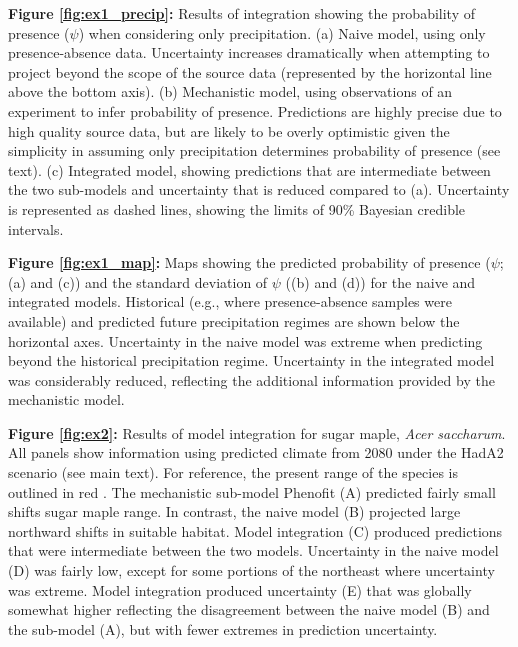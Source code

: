 \documentclass[11pt]{article}
\begin{document}
\begin{flushleft}
\textbf{Figure \ref{fig:ex1_precip}:}
	Results of integration showing the probability of presence (\(\psi\)) when considering only precipitation.
	(a) Naive model, using only presence-absence data. Uncertainty increases dramatically when attempting to project beyond the scope of the source data (represented by the horizontal line above the bottom axis).
	(b) Mechanistic model, using observations of an experiment to infer probability of presence. Predictions are highly precise due to high quality source data, but are likely to be overly optimistic given the simplicity in assuming only precipitation determines probability of presence (see text).
	(c) Integrated model, showing predictions that are intermediate between the two sub-models and uncertainty that is reduced compared to (a).
	Uncertainty is represented as dashed lines, showing the limits of 90\% Bayesian credible intervals.

\textbf{Figure \ref{fig:ex1_map}:}
	Maps showing the predicted probability of presence (\(\psi\); (a) and (c)) and the standard deviation of \(\psi\) ((b) and (d)) for the naive and integrated models.
	Historical (e.g., where presence-absence samples were available) and predicted future precipitation regimes are shown below the horizontal axes.
	Uncertainty in the naive model was extreme when predicting beyond the historical precipitation regime.
	Uncertainty in the integrated model was considerably reduced, reflecting the additional information provided by the mechanistic model.


\textbf{Figure \ref{fig:ex2}:}
	Results of model integration for sugar maple, \emph{Acer saccharum}.
	All panels show information using predicted climate from 2080 under the HadA2 scenario (see main text).
	For reference, the present range of the species is outlined in red \citep{Little1971}.
	The mechanistic sub-model Phenofit (A) predicted fairly small shifts sugar maple range.
	In contrast, the naive model (B) projected large northward shifts in suitable habitat.
	Model integration (C) produced predictions that were intermediate between the two models.
	Uncertainty in the naive model (D) was fairly low, except for some portions of the northeast where uncertainty was extreme.
	Model integration produced uncertainty (E) that was globally somewhat higher reflecting the disagreement between the naive model (B) and the sub-model (A), but with fewer extremes in prediction uncertainty.
	


\end{flushleft}
\end{document}
